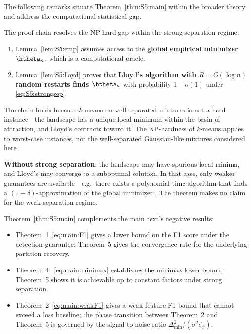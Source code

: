 The following remarks situate Theorem~\ref{thm:S5:main} within the
broader theory and address the computational-statistical gap.

\begin{remark}
\label{rem:S5:gap}
The proof chain resolves the NP-hard gap within the strong separation
regime:
\begin{enumerate}
\item Lemma~\ref{lem:S5:emp} assumes access to the \textbf{global
empirical minimizer} $\htheta_n$, which is a computational oracle.
\item Lemma~\ref{lem:S5:lloyd} proves that \textbf{Lloyd's algorithm
with $R=O(\log n)$ random restarts finds $\htheta_n$} with probability
$1-o(1)$ under \eqref{eq:S5:strongsep}.
\end{enumerate}
The chain holds because $k$-means on well-separated mixtures is not a
hard instance---the landscape has a unique local minimum within the
basin of attraction, and Lloyd's contracts toward it.  The NP-hardness
of $k$-means applies to worst-case instances, not the well-separated
Gaussian-like mixtures considered here.

\textbf{Without strong separation}: the landscape may have spurious
local minima, and Lloyd's may converge to a suboptimal solution.  In
that case, only weaker guarantees are available---e.g.\ there exists a
polynomial-time algorithm that finds a $(1+\delta)$-approximation of
the global minimizer \cite{kumar2010clustering,ostrovsky2013effectiveness}.
The theorem makes no claim for the weak separation regime.
\end{remark}

\begin{remark}
\label{rem:S5:relation}
Theorem~\ref{thm:S5:main} complements the main text's negative results:
\begin{itemize}
\item Theorem~1~\eqref{eq:main:F1} gives a lower bound on the F1 score
under the detection guarantee; Theorem~5 gives the convergence rate for
the underlying partition recovery.
\item Theorem~4'~\eqref{eq:main:minimax} establishes the minimax lower
bound; Theorem~5 shows it is achievable up to constant factors under
strong separation.
\item Theorem~2~\eqref{eq:main:weakF1} gives a weak-feature F1 bound that
cannot exceed a loss baseline; the phase transition between
Theorem~2 and Theorem~5 is governed by the signal-to-noise ratio
$\Delta_{\min}^2/(\sigma^2 d_\phi)$.
\end{itemize}
\end{remark}

